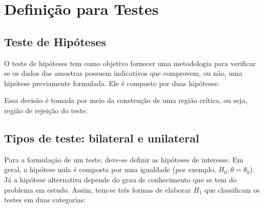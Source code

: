 \documentclass[
  portuguese,
]{estat/estat}
\let\oldsection\section
\renewcommand\section{\clearpage\oldsection}
\begin{document}
\section{Definição para Testes}\label{definiuxe7uxe3o-para-testes}

\subsection{Teste de Hipóteses}\label{teste-de-hipuxf3teses}

O teste de hipóteses tem como objetivo fornecer uma metodologia para
verificar se os dados das amostras possuem indicativos que comprovem, ou
não, uma hipótese previamente formulada. Ele é composto por duas
hipóteses:


Essa decisão é tomada por meio da construção de uma região crítica, ou
seja, região de rejeição do teste.

\subsection{Tipos de teste: bilateral e
unilateral}\label{tipos-de-teste-bilateral-e-unilateral}

Para a formulação de um teste, deve-se definir as hipóteses de
interesse. Em geral, a hipótese nula é composta por uma igualdade (por
exemplo, \(H_{0}: \theta = \theta_{0}\)). Já a hipótese alternativa
depende do grau de conhecimento que se tem do problema em estudo. Assim,
tem-se três formas de elaborar \(H_{1}\) que classificam os testes em
duas categorias:
\end{document}
